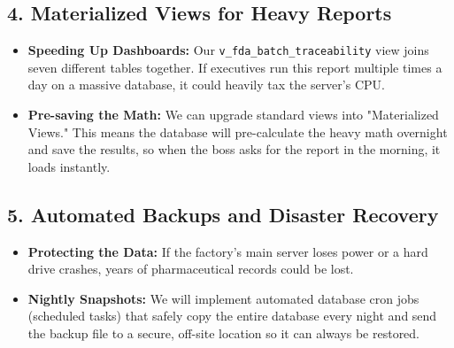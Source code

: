 \documentclass[12pt, a4paper]{article}
\begin{document}
\subsection*{4. Materialized Views for Heavy Reports}
\begin{itemize}
    \item[$\rightarrow$] \textbf{Speeding Up Dashboards:} Our \texttt{v\_fda\_batch\_traceability} view joins seven different tables together. If executives run this report multiple times a day on a massive database, it could heavily tax the server's CPU.
    \item[$\rightarrow$] \textbf{Pre-saving the Math:} We can upgrade standard views into "Materialized Views." This means the database will pre-calculate the heavy math overnight and save the results, so when the boss asks for the report in the morning, it loads instantly.
\end{itemize}

\subsection*{5. Automated Backups and Disaster Recovery}
\begin{itemize}
    \item[$\rightarrow$] \textbf{Protecting the Data:} If the factory's main server loses power or a hard drive crashes, years of pharmaceutical records could be lost.
    \item[$\rightarrow$] \textbf{Nightly Snapshots:} We will implement automated database cron jobs (scheduled tasks) that safely copy the entire database every night and send the backup file to a secure, off-site location so it can always be restored.
\end{itemize}
\end{document}
